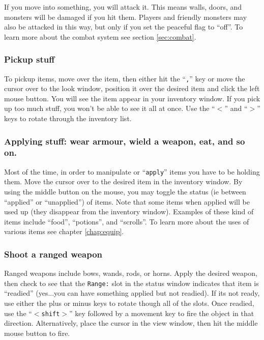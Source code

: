 If you move into something, you will attack it. This means walls,
doors, and monsters will be damaged if you hit them. Players and
friendly monsters may also be attacked in this way, but only if
you set the peaceful flag to ``off''. To learn more about the combat
system see section \ref{sec:combat}. \\

\subsubsection{Pickup stuff}
To pickup items, move over the item, then either hit the ``{\tt ,}'' key
or move the cursor over to the look window, position it over the desired
item and click the left mouse button. You will see the item appear in your
inventory window. If you pick up too much stuff, you won't be
able to see it all at once. Use the ``{\tt $<$}'' and ``{\tt $>$}'' keys
to rotate through the inventory list. \\

\subsubsection{Applying stuff: wear armour, wield a weapon, eat, and so on.}
Most of the time, in order to manipulate or ``{\tt apply}'' items you have
to be holding them. Move the cursor over to the desired item in the
inventory window. By using the middle button on the mouse, you may
toggle the status (ie between ``applied'' or ``unapplied'') of items.
Note that
some items when applied will be used up (they disappear from the
inventory window). Examples of these kind of
items include ``food'', ``potions'',
and ``scrolls''.
To learn more
about the uses of various items see chapter \ref{chap:equip}. \\

\subsubsection{Shoot a ranged weapon}
Ranged weapons include bows, wands,
rods, or horns. Apply the desired
weapon, then check to see that the {\tt Range:} slot in the status window
indicates that item is ``readied'' (yes...you can have something applied but
not readied). If its not ready, use either the plus or minus keys to
rotate though all of the slots. Once readied, use the ``{\tt $<$shift$>$}'' key
followed by a movement key to fire the object in that direction. Alternatively,
place the cursor in the view window, then hit the middle mouse button to fire. \\

